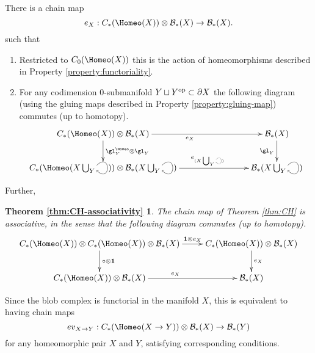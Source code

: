 \begin{thm:CH}
There is a chain map
\begin{equation*}
e_X: \CH{X} \tensor \bc_*(X) \to \bc_*(X).
\end{equation*}
such that
\begin{enumerate}
\item Restricted to $C_0(\Homeo(X))$ this is the action of homeomorphisms described in Property \ref{property:functoriality}. 

\item For
any codimension $0$-submanifold $Y \sqcup Y^\text{op} \subset \partial X$ the following diagram
(using the gluing maps described in Property \ref{property:gluing-map}) commutes (up to homotopy).
\begin{equation*}
\xymatrix@C+2cm{
     \CH{X} \otimes \bc_*(X)
        \ar[r]_{e_{X}}  \ar[d]^{\gl^{\Homeo}_Y \otimes \gl_Y}  &
            \bc_*(X) \ar[d]_{\gl_Y} \\
     \CH{X \bigcup_Y \selfarrow} \otimes \bc_*(X \bigcup_Y \selfarrow) \ar[r]^<<<<<<<<<<<<{e_{(X \bigcup_Y \scalebox{0.5}{\selfarrow})}}    & \bc_*(X \bigcup_Y \selfarrow)
}
\end{equation*}
\end{enumerate}
\end{thm:CH}

\newtheorem*{thm:CH-associativity}{Theorem \ref{thm:CH-associativity}}


Further,
\begin{thm:CH-associativity}
The chain map of Theorem \ref{thm:CH} is associative, in the sense that the following diagram commutes (up to homotopy).
\begin{equation*}
\xymatrix{
\CH{X} \tensor \CH{X} \tensor \bc_*(X) \ar[r]^<<<<<{\id \tensor e_X} \ar[d]^{\compose \tensor \id} & \CH{X} \tensor \bc_*(X) \ar[d]^{e_X} \\
\CH{X} \tensor \bc_*(X) \ar[r]^{e_X} & \bc_*(X)
}
\end{equation*}
\end{thm:CH-associativity}

Since the blob complex is functorial in the manifold $X$, this is equivalent to having chain maps
$$ev_{X \to Y} : \CH{X \to Y} \tensor \bc_*(X) \to \bc_*(Y)$$
for any homeomorphic pair $X$ and $Y$, 
satisfying corresponding conditions.


